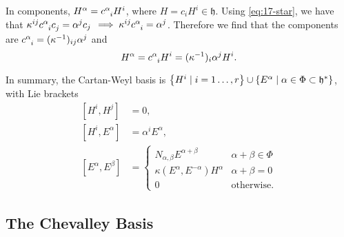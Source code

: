In components, $H^{\alpha} = c\indices{^{\alpha}_i} H^{i}$, where $H = c_{i} H^{i} \in \mathfrak{h}$.
Using \eqref{eq:17-star}, we have that $\kappa^{ij} c\indices{^{\alpha}_i} c\indices{_{j}} = \alpha^{j} c_{j}$ $\implies \kappa^{ij} c\indices{^{\alpha}_{i}}  = \alpha^{j}$. Therefore we find that the components are $c\indices{^{\alpha}_{i}} = (\kappa^{-1})_{ij} \alpha^{j}$ and
\begin{equation}
  \label{eq:17-7}
  H^{\alpha} = c\indices{^{\alpha}_{i}} H^{i} = (\kappa^{-1})_{i} \alpha^{j} H^{i}.
\end{equation}

In summary, the Cartan-Weyl basis is $\left\{ H^{i} \mid i = 1 \dots, r\right\} \cup \left\{ E^{\alpha} \suchthat \alpha \in \Phi \subset \mathfrak{h}^* \right\}$, with Lie brackets
\begin{subequations}
  \begin{align}
    [H^{i}, H^{j}] &= 0, \\
  [H^{i}, E^{\alpha}] &= \alpha^{i} E^{\alpha},\\
    [E^{\alpha}, E^{\beta}] &= 
    \begin{cases}
      N_{\alpha, \beta} E^{\alpha + \beta} & \alpha + \beta \in \Phi \\
      \kappa(E^{\alpha}, E^{-\alpha}) H^{\alpha} & \alpha + \beta = 0 \\
      0 & \text{otherwise}.
    \end{cases}
  \end{align}
\end{subequations}

\subsection{The Chevalley Basis}%
\label{sub:the_chevalley_basis}

